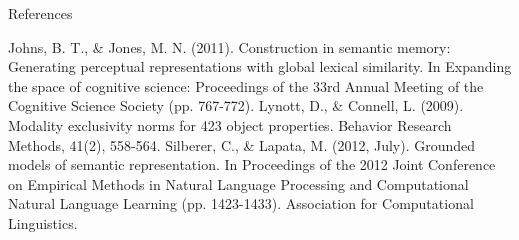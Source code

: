 \documentclass[12pt,a4paper]{beamer}
\begin{document}
\begin{frame}{References}
\begin{thebibliography}{-}
 Johns, B. T., \& Jones, M. N. (2011). Construction in semantic memory: Generating perceptual representations with global lexical similarity. In Expanding the space of cognitive science: Proceedings of the 33rd Annual Meeting of the Cognitive Science Society (pp. 767-772).
 Lynott, D., \& Connell, L. (2009). Modality exclusivity norms for 423 object properties. Behavior Research Methods, 41(2), 558-564.
 Silberer, C., \& Lapata, M. (2012, July). Grounded models of semantic representation. In Proceedings of the 2012 Joint Conference on Empirical Methods in Natural Language Processing and Computational Natural Language Learning (pp. 1423-1433). Association for Computational Linguistics.
\end{thebibliography}
\end{frame}
\end{document}
